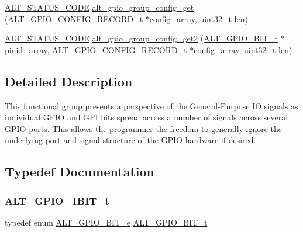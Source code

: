 \begin{DoxyCompactItemize}
\mbox{\hyperlink{hwlib_8h_abdb0d369f069723ca55d6c94bcaaaa12}{A\+L\+T\+\_\+\+S\+T\+A\+T\+U\+S\+\_\+\+C\+O\+DE}} \mbox{\hyperlink{group__ALT__GPIO__BITVIEW_ga9fa743774626ba7013991bf9cce4782f}{alt\+\_\+gpio\+\_\+group\+\_\+config\+\_\+get}} (\mbox{\hyperlink{group__ALT__GPIO__BITVIEW_ga4f9ae2a8f2479be9005d07d74e1c91fd}{A\+L\+T\+\_\+\+G\+P\+I\+O\+\_\+\+C\+O\+N\+F\+I\+G\+\_\+\+R\+E\+C\+O\+R\+D\+\_\+t}} $\ast$config\+\_\+array, uint32\+\_\+t len)
\item 
\mbox{\hyperlink{hwlib_8h_abdb0d369f069723ca55d6c94bcaaaa12}{A\+L\+T\+\_\+\+S\+T\+A\+T\+U\+S\+\_\+\+C\+O\+DE}} \mbox{\hyperlink{group__ALT__GPIO__BITVIEW_ga513a2e1d2733a5ba1ea0369f6af1a845}{alt\+\_\+gpio\+\_\+group\+\_\+config\+\_\+get2}} (\mbox{\hyperlink{group__ALT__GPIO__BITVIEW_ga6d149a5961bef8b91b8108e3838b1e09}{A\+L\+T\+\_\+\+G\+P\+I\+O\+\_\+B\+I\+T\+\_\+t}} $\ast$pinid\+\_\+array, \mbox{\hyperlink{group__ALT__GPIO__BITVIEW_ga4f9ae2a8f2479be9005d07d74e1c91fd}{A\+L\+T\+\_\+\+G\+P\+I\+O\+\_\+\+C\+O\+N\+F\+I\+G\+\_\+\+R\+E\+C\+O\+R\+D\+\_\+t}} $\ast$config\+\_\+array, uint32\+\_\+t len)
\end{DoxyCompactItemize}


\subsection{Detailed Description}
This functional group presents a perspective of the General-\/\+Purpose \mbox{\hyperlink{structIO}{IO}} signals as individual G\+P\+IO and G\+PI bits spread across a number of signals across several G\+P\+IO ports. This allows the programmer the freedom to generally ignore the underlying port and signal structure of the G\+P\+IO hardware if desired. 

\subsection{Typedef Documentation}
\mbox{\label{group__ALT__GPIO__BITVIEW_ga6d149a5961bef8b91b8108e3838b1e09}} 
\subsubsection{\texorpdfstring{ALT\_GPIO\_1BIT\_t}{ALT\_GPIO\_1BIT\_t}}
{\footnotesize\ttfamily typedef enum \mbox{\hyperlink{group__ALT__GPIO__BITVIEW_ga59d65695b346291e584e1a3590520802}{A\+L\+T\+\_\+\+G\+P\+I\+O\+\_\+B\+I\+T\+\_\+e}}  \mbox{\hyperlink{group__ALT__GPIO__BITVIEW_ga6d149a5961bef8b91b8108e3838b1e09}{A\+L\+T\+\_\+\+G\+P\+I\+O\+\_\+B\+I\+T\+\_\+t}}}

